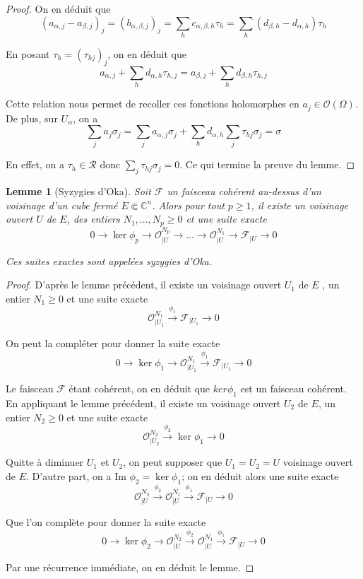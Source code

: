 \documentclass{article}
\newtheorem{lemme}[theoreme]{Lemme}
\theoremstyle{definition}
\theoremstyle{remark}
\begin{document}
\begin{proof}
On en déduit que $$(a_{\alpha,j} - a_{\beta,j})_j = (b_{\alpha,\beta,j})_j = \sum_h c_{\alpha,\beta,h}\tau_h = \sum_h (d_{\beta, h} - d_{\alpha,h})\tau_h$$

En posant $\tau_h = (\tau_{hj})_j$, on en déduit que
$$a_{\alpha,j} + \sum_h d_{\alpha,h}\tau_{h, j} = a_{\beta,j} + \sum_h d_{\beta,h}\tau_{h, j}$$

Cette relation nous permet de recoller ces fonctions holomorphes en $a_j \in \mathcal{O}(\Omega)$. De plus, sur $U_\alpha$, on a
$$\sum_j a_j\sigma_j = \sum_j a_{\alpha,j}\sigma_j + \sum_h d_{\alpha,h}\sum_j \tau_{hj}\sigma_j = \sigma$$

En effet, on a $\tau_h \in \mathcal{R}$ donc $\sum_j \tau_{hj}\sigma_j = 0$. Ce qui termine la preuve du lemme.
\end{proof}

\begin{lemme}[Syzygies d'Oka]
Soit $\mathcal{F}$ un faisceau cohérent au-dessus d'un voisinage d'un cube fermé $E \Subset \mathbb{C}^n$. Alors pour tout $p \geq 1$, il existe un voisinage ouvert $U$ de $E$, des entiers $N_1,...,N_p \geq 0$ et une suite exacte
$$0 \to \ker \phi_p \to \mathcal{O}^{N_p}_{|U} \to ... \to \mathcal{O}^{N_1}_{|U} \to \mathcal{F}_{|U} \to 0$$

Ces suites exactes sont appelées syzygies d'Oka.
\end{lemme}

\begin{proof}
D'après le lemme précédent, il existe un voisinage ouvert $U_1$ de $E$ , un entier $N_1 \geq 0$ et une suite exacte
$$\mathcal{O}^{N_1}_{|U_1} \overset{\phi_1}{\to} \mathcal{F}_{|U_1} \to 0$$

On peut la compléter pour donner la suite exacte
$$0 \to \ker \phi_1 \to \mathcal{O}^{N_1}_{|U_1} \overset{\phi_1}{\to} \mathcal{F}_{|U_1} \to 0$$

Le faisceau $\mathcal{F}$ étant cohérent, on en déduit que $ker \phi_1$ est un faisceau cohérent. En appliquant le lemme précédent, il existe un voisinage ouvert $U_2$ de $E$, un entier $N_2 \geq 0$ et une suite exacte
$$\mathcal{O}^{N_2}_{|U_2} \overset{\phi_2}{\to} \ker \phi_1 \to 0$$

Quitte à diminuer $U_1$ et $U_2$, on peut supposer que $U_1 = U_2 = U$ voisinage ouvert de $E$. D'autre part, on a Im $\phi_2 = \ker \phi_1$; on en déduit alors une suite exacte
$$\mathcal{O}^{N_2}_{|U} \overset{\phi_2}{\to} \mathcal{O}^{N_1}_{|U} \overset{\phi_1}{\to} \mathcal{F}_{|U} \to 0$$

Que l'on complète pour donner la suite exacte
$$0 \to \ker \phi_2 \to \mathcal{O}^{N_2}_{|U} \overset{\phi_2}{\to} \mathcal{O}^{N_1}_{|U} \overset{\phi_1}{\to} \mathcal{F}_{|U} \to 0$$

Par une récurrence immédiate, on en déduit le lemme.
\end{proof}
\end{document}
